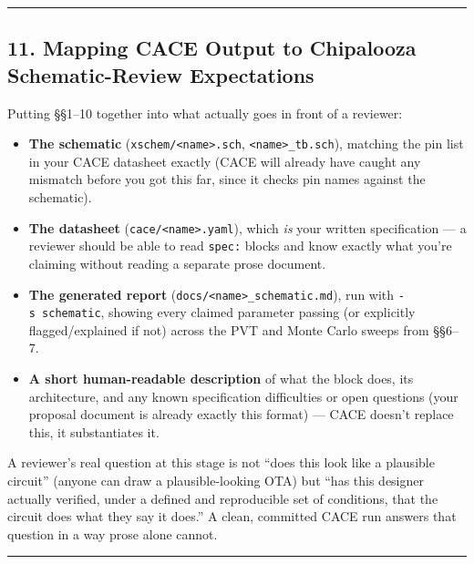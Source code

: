 \documentclass[
]{article}
\providecommand{\tightlist}{%
  \setlength{\itemsep}{0pt}\setlength{\parskip}{0pt}}
\begin{document}
\begin{center}\rule{0.5\linewidth}{0.5pt}\end{center}

\hypertarget{mapping-cace-output-to-chipalooza-schematic-review-expectations}{%
\subsection{11. Mapping CACE Output to Chipalooza Schematic-Review
Expectations}\label{mapping-cace-output-to-chipalooza-schematic-review-expectations}}

Putting §§1--10 together into what actually goes in front of a reviewer:

\begin{itemize}
\tightlist
\item
  \textbf{The schematic}
  (\texttt{xschem/\textless{}name\textgreater{}.sch},
  \texttt{\textless{}name\textgreater{}\_tb.sch}), matching the pin list
  in your CACE datasheet exactly (CACE will already have caught any
  mismatch before you got this far, since it checks pin names against
  the schematic).
\item
  \textbf{The datasheet}
  (\texttt{cace/\textless{}name\textgreater{}.yaml}), which \emph{is}
  your written specification --- a reviewer should be able to read
  \texttt{spec:} blocks and know exactly what you're claiming without
  reading a separate prose document.
\item
  \textbf{The generated report}
  (\texttt{docs/\textless{}name\textgreater{}\_schematic.md}), run with
  \texttt{-s\ schematic}, showing every claimed parameter passing (or
  explicitly flagged/explained if not) across the PVT and Monte Carlo
  sweeps from §§6--7.
\item
  \textbf{A short human-readable description} of what the block does,
  its architecture, and any known specification difficulties or open
  questions (your proposal document is already exactly this format) ---
  CACE doesn't replace this, it substantiates it.
\end{itemize}

A reviewer's real question at this stage is not ``does this look like a
plausible circuit'' (anyone can draw a plausible-looking OTA) but ``has
this designer actually verified, under a defined and reproducible set of
conditions, that the circuit does what they say it does.'' A clean,
committed CACE run answers that question in a way prose alone cannot.

\begin{center}\rule{0.5\linewidth}{0.5pt}\end{center}
\end{document}
